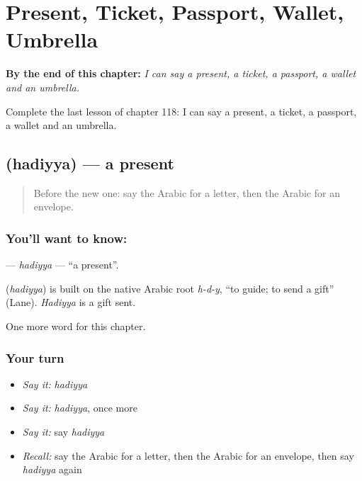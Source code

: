 
\chapter{Present, Ticket, Passport, Wallet, Umbrella}
\label{ch:ar-present-ticket-passport-wallet-umbrella}

\begin{chapteropening}
\textbf{By the end of this chapter:} \emph{I can say a present, a ticket, a passport, a wallet and an umbrella.}

Complete the last lesson of chapter 118: I can say a present, a ticket, a passport, a wallet and an umbrella.
\end{chapteropening}

\section[\texorpdfstring{\ar{هدية} (hadiyya)}{هدية (hadiyya)}]{ (hadiyya) — a present}

\label{lesson:AR-C118-hadiyya}



\begin{quote}
Before the new one: say the Arabic for a letter, then the Arabic for an envelope.
\end{quote}

\subsection*{You'll want to know: }
\textbf{} — \emph{hadiyya} — \textquotedblleft{}a present\textquotedblright{}.

\begin{cousinweb}
\textbf{} (\emph{hadiyya}) is built on the native Arabic root \emph{h-d-y}, \textquotedblleft{}to guide; to send a gift\textquotedblright{} (Lane). \emph{Hadiyya} is a gift sent.
\end{cousinweb}

\begin{grammarlens}[title={What you've built}]
One more word for this chapter.
\end{grammarlens}

\subsection*{Your turn}
\begin{itemize}
\raggedright
  \item \emph{Say it:} \emph{hadiyya}
  \item \emph{Say it:} \emph{hadiyya}, once more
  \item \emph{Say it:} say \emph{hadiyya}
  \item \emph{Recall:} say the Arabic for a letter, then the Arabic for an envelope, then say \emph{hadiyya} again
\end{itemize}

